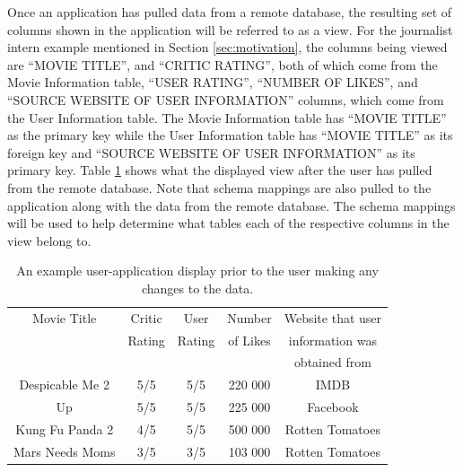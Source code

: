 \documentclass[12pt]{article}
\begin{document}
Once an application has pulled data from a remote database, the resulting set of columns shown in the application will be referred to as a view. For the journalist intern example mentioned in Section \ref{sec:motivation}, the columns being viewed are ``MOVIE TITLE'', and ``CRITIC RATING'', both of which come from the Movie Information table, ``USER RATING'', ``NUMBER OF LIKES'', and ``SOURCE WEBSITE OF USER INFORMATION'' columns, which come from the User Information table. The Movie Information table has ``MOVIE TITLE'' as the primary key while the User Information table has ``MOVIE TITLE'' as its foreign key and ``SOURCE WEBSITE OF USER INFORMATION'' as its primary key. Table \ref{table:add_row_table_example} shows what the displayed view after the user has pulled from the remote database. Note that schema mappings are also pulled to the application along with the data from the remote database. The schema mappings will be used to help determine what tables each of the respective columns in the view belong to.

\begin{table}[!ht]
\centering
\begin{tabular}{ | c | c | c | c | c | }
 \hline
    Movie Title & Critic  & User & Number & Website that user\\
    & Rating & Rating & of Likes & information was \\
    &&&& obtained from\\ \hline \hline
    Despicable Me 2 & 5/5 & 5/5 & 220 000 & IMDB\\ \hline
    Up & 5/5 & 5/5 & 225 000 & Facebook\\ \hline
    Kung Fu Panda 2 & 4/5 & 5/5 & 500 000 & Rotten Tomatoes\\ \hline
    Mars Needs Moms & 3/5 & 3/5 & 103 000 & Rotten Tomatoes\\
    \hline
\end{tabular}
\caption{An example user-application display prior to the user making any changes to the data.}
\label{table:add_row_table_example}
\end{table}
\end{document}
